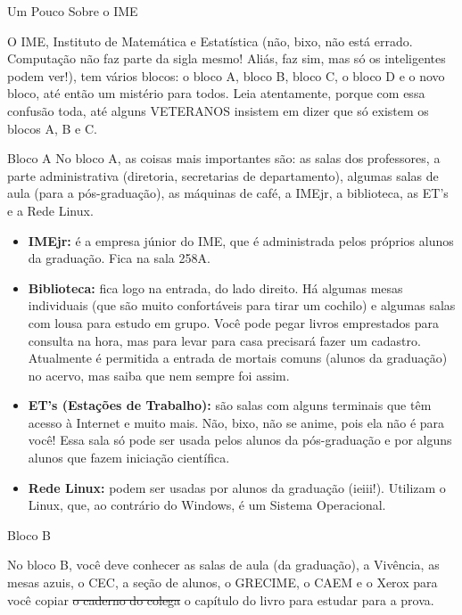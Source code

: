 \begin{secao}{Um Pouco Sobre o IME}

O IME, Instituto de Matemática e Estatística (não, bixo, não está errado.
Computação não faz parte da sigla mesmo! Aliás, faz sim, mas só os inteligentes
podem ver!), tem vários blocos: o bloco A, bloco B, bloco C, o bloco D e o novo
 bloco, até então um mistério para todos. Leia atentamente, porque com essa
 confusão toda, até alguns VETERANOS insistem em dizer que só existem os blocos
 A, B e C.

\begin{subsecao}{Bloco A}
No bloco A, as coisas mais importantes são: as salas dos professores, a parte
administrativa (diretoria, secretarias de departamento), algumas salas de aula
(para a pós-graduação), as máquinas de café, a IMEjr, a biblioteca, as ET's e
a Rede Linux.

\begin{itemize}

\item {\bf IMEjr:} é a empresa júnior do IME, que é administrada pelos próprios
alunos da graduação. Fica na sala 258A.

\item {\bf Biblioteca:} fica logo na entrada, do lado direito. Há algumas mesas
individuais (que são muito confortáveis para tirar um cochilo) e algumas salas
com lousa para estudo em grupo. Você pode pegar livros emprestados para consulta
na hora, mas para levar para casa precisará fazer um cadastro. Atualmente é
permitida a entrada de mortais comuns (alunos da graduação) no acervo, mas saiba
que nem sempre foi assim.

\item {\bf ET's (Estações de Trabalho):} são salas com alguns terminais que têm
acesso à Internet e muito mais. Não, bixo, não se anime, pois ela não é para
você! Essa sala só pode ser usada pelos alunos da pós-graduação e por alguns
alunos que fazem iniciação científica.

\item {\bf Rede Linux:} podem ser usadas por alunos da graduação (ieiii!).
 Utilizam o Linux, que, ao contrário do Windows, é um Sistema Operacional.

\end{itemize}
\end{subsecao}

\begin{subsecao}{Bloco B}

No bloco B, você deve conhecer as salas de aula (da graduação), a Vivência, as
mesas azuis, o CEC, a seção de alunos, o GRECIME, o CAEM e o Xerox para você
copiar \sout{o caderno do colega} o capítulo do livro para estudar para a prova.


\end{subsecao}
\end{secao}
